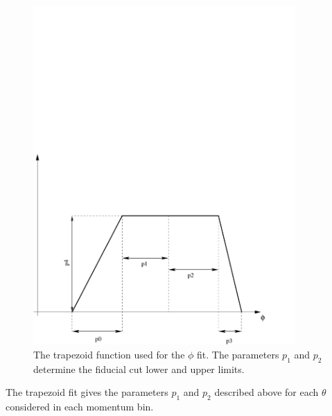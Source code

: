 \vspace{-0.5cm}
\begin{figure}[h]
 \begin{center}
 \includegraphics[width = 10cm, bb=-40 20 580 440]{img/traped}
  \caption[The trapezoid function used for the $\phi$ fit]
          { The trapezoid function used for the $\phi$ fit. The parameters $p_1$ and $p_2$ determine
                     the fiducial cut lower and upper limits.  }
 \end{center}
\end{figure}
The trapezoid fit gives the parameters $p_1$ and $p_2$ described above for each $\theta$ considered
in each momentum bin.